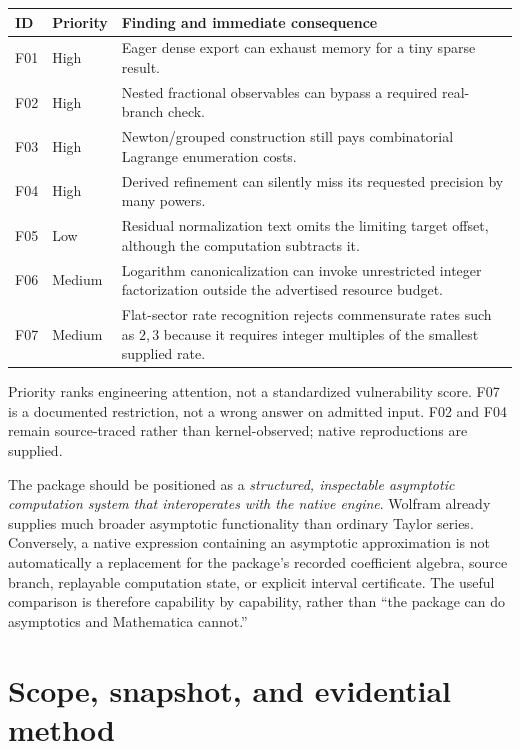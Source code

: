 \documentclass[11pt,a4paper]{article}
\theoremstyle{definition}
\begin{document}
\begin{center}
\begin{tabularx}{\linewidth}{@{}P{10mm}P{19mm}Y@{}}
\toprule
ID & Priority & Finding and immediate consequence\\
\midrule
F01 & High & Eager dense export can exhaust memory for a tiny sparse result.\\
F02 & High & Nested fractional observables can bypass a required real-branch check.\\
F03 & High & Newton/grouped construction still pays combinatorial Lagrange enumeration costs.\\
F04 & High & Derived refinement can silently miss its requested precision by many powers.\\
F05 & Low & Residual normalization text omits the limiting target offset, although the computation subtracts it.\\
F06 & Medium & Logarithm canonicalization can invoke unrestricted integer factorization outside the advertised resource budget.\\
F07 & Medium & Flat-sector rate recognition rejects commensurate rates such as $2,3$ because it requires integer multiples of the smallest supplied rate.\\
\bottomrule
\end{tabularx}
\end{center}

Priority ranks engineering attention, not a standardized vulnerability score. F07 is a documented restriction, not a wrong answer on admitted input. F02 and F04 remain source-traced rather than kernel-observed; native reproductions are supplied.

The package should be positioned as a \emph{structured, inspectable asymptotic computation system that interoperates with the native engine}. Wolfram already supplies much broader asymptotic functionality than ordinary Taylor series. Conversely, a native expression containing an asymptotic approximation is not automatically a replacement for the package's recorded coefficient algebra, source branch, replayable computation state, or explicit interval certificate. The useful comparison is therefore capability by capability, rather than ``the package can do asymptotics and Mathematica cannot.''\cite{wl-series,wl-asymptotic,wl-asolve}

\clearpage
{\small\setlength{\parskip}{0pt}\tableofcontents}
\clearpage

\section{Scope, snapshot, and evidential method}
\label{sec:scope}
\end{document}
